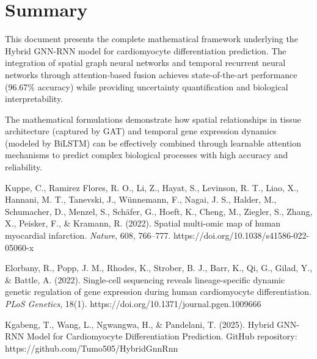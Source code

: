 \documentclass[12pt]{article}
\begin{document}

\section{Summary}

This document presents the complete mathematical framework underlying the Hybrid GNN-RNN model for cardiomyocyte differentiation prediction. The integration of spatial graph neural networks and temporal recurrent neural networks through attention-based fusion achieves state-of-the-art performance (96.67\% accuracy) while providing uncertainty quantification and biological interpretability.

The mathematical formulations demonstrate how spatial relationships in tissue architecture (captured by GAT) and temporal gene expression dynamics (modeled by BiLSTM) can be effectively combined through learnable attention mechanisms to predict complex biological processes with high accuracy and reliability.

\begin{thebibliography}{99}

Kuppe, C., Ramirez Flores, R. O., Li, Z., Hayat, S., Levinson, R. T., Liao, X., Hannani, M. T., Tanevski, J., Wünnemann, F., Nagai, J. S., Halder, M., Schumacher, D., Menzel, S., Schäfer, G., Hoeft, K., Cheng, M., Ziegler, S., Zhang, X., Peisker, F., \& Kramann, R. (2022). Spatial multi-omic map of human myocardial infarction. \textit{Nature}, 608, 766–777. https://doi.org/10.1038/s41586-022-05060-x

Elorbany, R., Popp, J. M., Rhodes, K., Strober, B. J., Barr, K., Qi, G., Gilad, Y., \& Battle, A. (2022). Single-cell sequencing reveals lineage-specific dynamic genetic regulation of gene expression during human cardiomyocyte differentiation. \textit{PLoS Genetics}, 18(1). https://doi.org/10.1371/journal.pgen.1009666

Kgabeng, T., Wang, L., Ngwangwa, H., \& Pandelani, T. (2025). Hybrid GNN-RNN Model for Cardiomyocyte Differentiation Prediction. GitHub repository: https://github.com/Tumo505/HybridGnnRnn

\end{thebibliography}
\end{document}
